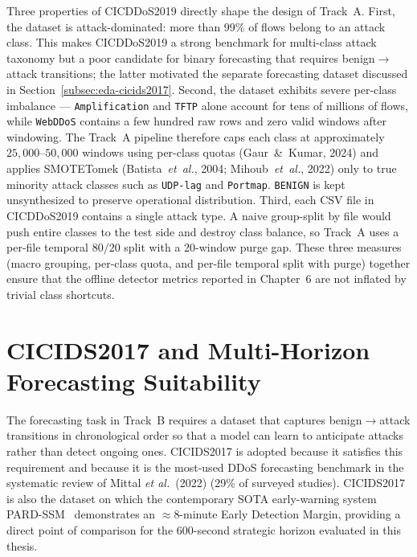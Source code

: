 \documentclass[12pt, a4paper, reqno, oneside]{book}
\begin{document}
Three properties of CICDDoS2019 directly shape the design of Track~A. First,
the dataset is attack-dominated: more than 99\% of flows belong to an attack
class. This makes CICDDoS2019 a strong benchmark for multi-class attack
taxonomy but a poor candidate for binary forecasting that requires
benign$\rightarrow$attack transitions; the latter motivated the separate
forecasting dataset discussed in Section~\ref{subsec:eda-cicids2017}. Second,
the dataset exhibits severe per-class imbalance --- \texttt{Amplification} and
\texttt{TFTP} alone account for tens of millions of flows, while
\texttt{WebDDoS} contains a few hundred raw rows and zero valid windows after
windowing. The Track~A pipeline therefore caps
each class at approximately $25{,}000$--$50{,}000$ windows using per-class quotas
(Gaur~\&~Kumar, 2024) and applies SMOTETomek
(Batista~\textit{et~al.}, 2004; Mihoub~\textit{et~al.}, 2022) only to true
minority attack classes such as \texttt{UDP-lag} and \texttt{Portmap}.
\texttt{BENIGN} is kept unsynthesized to preserve operational distribution.
Third, each CSV file in CICDDoS2019 contains a single attack type. A naive
group-split by file would push entire classes to the test side and destroy
class balance, so Track~A uses a per-file temporal $80/20$ split with a
20-window purge gap. These three measures (macro grouping, per-class quota,
and per-file temporal split with purge) together ensure that the offline detector metrics
reported in Chapter~6 are not inflated by trivial class shortcuts.

\section{CICIDS2017 and Multi-Horizon Forecasting Suitability}
\label{sec:cicids2017-bg}

The forecasting task in Track~B requires a dataset that captures
benign$\rightarrow$attack transitions in chronological order so that a
model can learn to anticipate attacks rather than detect ongoing ones.
CICIDS2017 \cite{sharafaldin2018cicids,cicids2017_official} is adopted because it
satisfies this requirement and because it is the most-used DDoS forecasting
benchmark in the systematic review of Mittal \textit{et al.}~(2022) (29\% of
surveyed studies). CICIDS2017 is also the dataset on which the contemporary
SOTA early-warning system PARD-SSM~\cite{hiremath2026pardssm} demonstrates an
$\approx$8-minute Early Detection Margin, providing a direct point of
comparison for the 600-second strategic horizon evaluated in this thesis.
\end{document}
